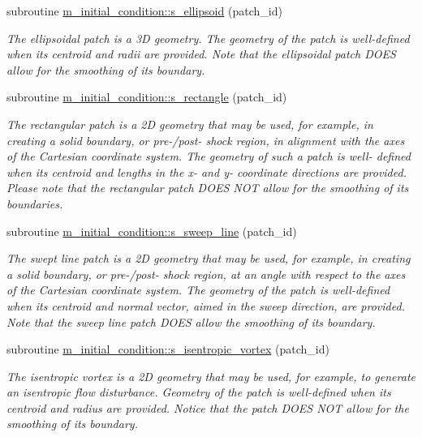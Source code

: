 \begin{DoxyCompactItemize}
subroutine \hyperlink{namespacem__initial__condition_a524f37de8423b7943c22c5d105eda922}{m\+\_\+initial\+\_\+condition\+::s\+\_\+ellipsoid} (patch\+\_\+id)
\begin{DoxyCompactList}\small\item\em The ellipsoidal patch is a 3D geometry. The geometry of the patch is well-\/defined when its centroid and radii are provided. Note that the ellipsoidal patch D\+O\+ES allow for the smoothing of its boundary. \end{DoxyCompactList}\item 
subroutine \hyperlink{namespacem__initial__condition_a9c54a1e384e94493914688f9a2a2cf14}{m\+\_\+initial\+\_\+condition\+::s\+\_\+rectangle} (patch\+\_\+id)
\begin{DoxyCompactList}\small\item\em The rectangular patch is a 2D geometry that may be used, for example, in creating a solid boundary, or pre-\//post-\/ shock region, in alignment with the axes of the Cartesian coordinate system. The geometry of such a patch is well-\/ defined when its centroid and lengths in the x-\/ and y-\/ coordinate directions are provided. Please note that the rectangular patch D\+O\+ES N\+OT allow for the smoothing of its boundaries. \end{DoxyCompactList}\item 
subroutine \hyperlink{namespacem__initial__condition_ab056c04c30f55423904517abe61ebd99}{m\+\_\+initial\+\_\+condition\+::s\+\_\+sweep\+\_\+line} (patch\+\_\+id)
\begin{DoxyCompactList}\small\item\em The swept line patch is a 2D geometry that may be used, for example, in creating a solid boundary, or pre-\//post-\/ shock region, at an angle with respect to the axes of the Cartesian coordinate system. The geometry of the patch is well-\/defined when its centroid and normal vector, aimed in the sweep direction, are provided. Note that the sweep line patch D\+O\+ES allow the smoothing of its boundary. \end{DoxyCompactList}\item 
subroutine \hyperlink{namespacem__initial__condition_ab329077796ad7579df0a96543263150d}{m\+\_\+initial\+\_\+condition\+::s\+\_\+isentropic\+\_\+vortex} (patch\+\_\+id)
\begin{DoxyCompactList}\small\item\em The isentropic vortex is a 2D geometry that may be used, for example, to generate an isentropic flow disturbance. Geometry of the patch is well-\/defined when its centroid and radius are provided. Notice that the patch D\+O\+ES N\+OT allow for the smoothing of its boundary. \end{DoxyCompactList}\item 

\end{DoxyCompactItemize}
